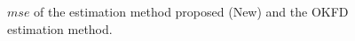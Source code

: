 \documentclass[
  12pt,
]{article}
\theoremstyle{definition}
\theoremstyle{definition}
\theoremstyle{definition}
\theoremstyle{remark}
\begin{document}
\begin{figure}[htbp]
  \caption{$mse$ of the estimation method proposed (New) and the OKFD estimation method.}
\end{figure}
\end{document}
